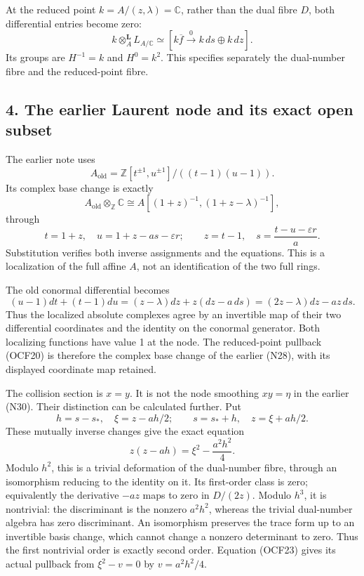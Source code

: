 \documentclass[
]{article}
\begin{document}
At the reduced point \(k=A/(z,\lambda)=\mathbb C\), rather than the dual
fibre \(D\), both differential entries become zero: \[
k\otimes_A^{\mathbf L}L_{A/\mathbb C}
\simeq[k\overline f\xrightarrow0 k\,ds\oplus k\,dz].
\tag{OCF20}
\] Its groups are \(H^{-1}=k\) and \(H^0=k^2\). This specifies
separately the dual-number fibre and the reduced-point fibre.

\subsection{4. The earlier Laurent node and its exact open
subset}\label{the-earlier-laurent-node-and-its-exact-open-subset}

The earlier note uses \[
A_{\mathrm{old}}=
\mathbb Z[t^{\pm1},u^{\pm1}]/((t-1)(u-1)).
\] Its complex base change is exactly \[
A_{\mathrm{old}}\otimes_{\mathbb Z}\mathbb C
\cong A[(1+z)^{-1},(1+z-\lambda)^{-1}],
\tag{OCF21}
\] through \[
t=1+z,\quad u=1+z-as-\varepsilon r;
\qquad z=t-1,\quad s=\frac{t-u-\varepsilon r}{a}.
\tag{OCF22}
\] Substitution verifies both inverse assignments and the equations.
This is a localization of the full affine \(A\), not an identification
of the two full rings.

The old conormal differential becomes \[
(u-1)dt+(t-1)du
=(z-\lambda)dz+z(dz-a\,ds)
=(2z-\lambda)dz-az\,ds.
\] Thus the localized absolute complexes agree by an invertible map of
their two differential coordinates and the identity on the conormal
generator. Both localizing functions have value 1 at the node. The
reduced-point pullback (OCF20) is therefore the complex base change of
the earlier (N28), with its displayed coordinate map retained.

The collision section is \(x=y\). It is not the node smoothing
\(xy=\eta\) in the earlier (N30). Their distinction can be calculated
further. Put \[
h=s-s_*,\quad \xi=z-ah/2;
\qquad s=s_*+h,\quad z=\xi+ah/2.
\] These mutually inverse changes give the exact equation \[
z(z-ah)=\xi^2-\frac{a^2h^2}{4}.
\tag{OCF23}
\] Modulo \(h^2\), this is a trivial deformation of the dual-number
fibre, through an isomorphism reducing to the identity on it. Its
first-order class is zero; equivalently the derivative \(-az\) maps to
zero in \(D/(2z)\). Modulo \(h^3\), it is nontrivial: the discriminant
is the nonzero \(a^2h^2\), whereas the trivial dual-number algebra has
zero discriminant. An isomorphism preserves the trace form up to an
invertible basis change, which cannot change a nonzero determinant to
zero. Thus the first nontrivial order is exactly second order. Equation
(OCF23) gives its actual pullback from \(\xi^2-v=0\) by \(v=a^2h^2/4\).
\end{document}
